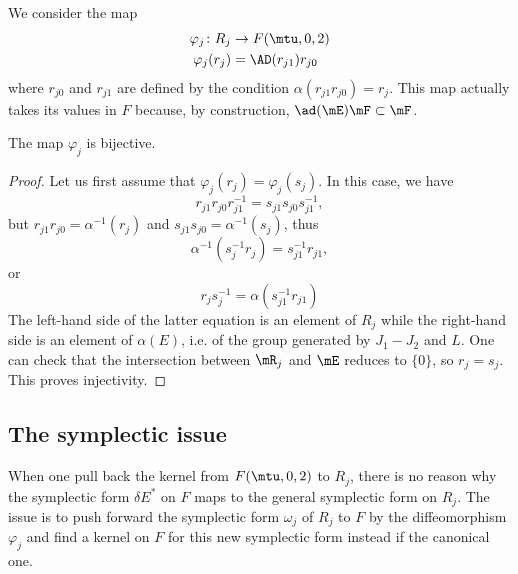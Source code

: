 We consider the map
\begin{equation}
\begin{aligned}
 \varphi_j\colon R_j&\to F(\mtu,0,2) \\
\varphi_j(r_{j})&= \AD(r_{j1})r_{j0}
\end{aligned}
\end{equation}
where $r_{j0}$ and $r_{j1}$ are defined by the condition $\alpha(r_{j1}r_{j0})=r_{j}$. This map actually takes its values in $F$ because, by construction, $\ad(\mE)\mF\subset\mF$.

\begin{theorem}
The map $\varphi_j$ is bijective.
\end{theorem}

\begin{proof}
Let us first assume that $\varphi_j(r_{j})=\varphi_j(s_{j})$. In this case, we have
\[
  r_{j1}r_{j0}r_{j1}^{-1}=s_{j1}s_{j0}s_{j1}^{-1},
\]
but $r_{j1}r_{j0}=\alpha^{-1}(r_{j})$ and $s_{j1}s_{j0}=\alpha^{-1}(s_{j})$, thus
\[
  \alpha^{-1}(s_{j}^{-1}r_{j})=s_{j1}^{-1}r_{j1},
\]
or
\[
  r_{j}s_{j}^{-1}=\alpha(s_{j1}^{-1}r_{j1})
\]
The left-hand side of the latter equation is an element of $R_{j}$ while the right-hand side is an element of $\alpha(E)$, i.e. of the group generated by $J_{1}-J_{2}$ and $L$. One can check that the intersection between $\mR_{j}$ and $\mE$ reduces to $\{ 0 \}$, so $r_{j}=s_{j}$. This proves injectivity.
\end{proof}

\subsection{The symplectic issue}

When one pull back the kernel from $F(\mtu,0,2)$ to $R_{j}$, there is no reason why the symplectic form $\delta E^*$ on $F$ maps to the general symplectic form on $R_j$. The issue is to push forward the symplectic form $\omega_{j}$ of $R_j$ to $F$ by the diffeomorphism $\varphi_j$ and find a kernel on $F$ for this new symplectic form instead if the canonical one.

